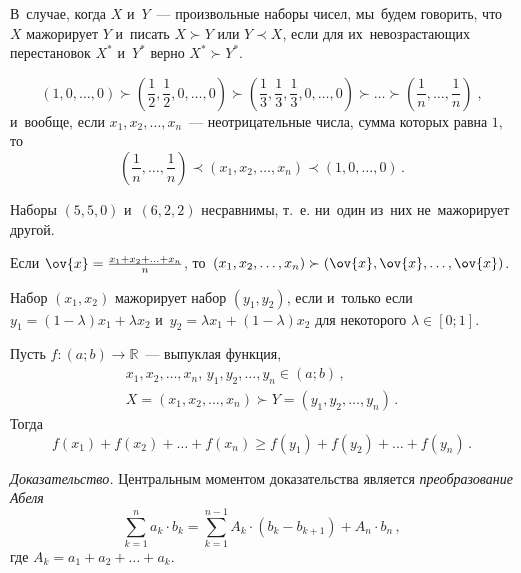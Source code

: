 В~случае, когда $X$ и~$Y$~— произвольные наборы чисел, мы~будем говорить,
что $X$ мажорирует $Y$ и~писать $X\succ Y$ или $Y\prec X$, если для
их~невозрастающих перестановок $X^*$ и~$Y^*$ верно $X^*\succ Y^*$.

\[
    \left( 1, 0, \ldots, 0 \right)
\succ
    \left( \frac{1}{2}, \frac{1}{2}, 0, \ldots,0 \right)
\succ
    \left( \frac{1}{3}, \frac{1}{3}, \frac{1}{3}, 0, \ldots, 0 \right)
\succ\ldots\succ
    \left( \frac{1}{n}, \ldots, \frac{1}{n} \right)
\; , \]
и~вообще, если $x_1, x_2, \ldots, x_n$~— неотрицательные числа, сумма
которых равна $1$, то%
\[
    \left( \frac{1}{n}, \ldots, \frac{1}{n} \right)
\prec
    \left( x_1, x_2, \ldots, x_n \right)
\prec
    \left( 1, 0, \ldots, 0 \right)
\, . \]

Наборы $(5, 5, 0)$ и~$(6, 2, 2)$ несравнимы, т.~е. ни~один из~них
не~мажорирует другой.

Если $\ov{x} = \frac{x_1 + x_2 + \ldots + x_n}{n}$,
то~$(x_1, x_2, \ldots, x_n) \succ (\ov{x}, \ov{x}, \ldots, \ov{x})$.

Набор $(x_1, x_2)$ мажорирует набор $(y_1, y_2)$, если и~только если
$y_1 = (1 - \lambda) x_1 + \lambda x_2$
и~$y_2 = \lambda x_1 + (1 - \lambda) x_2$
для некоторого $\lambda \in [0; 1]$.

\hrulefill

Пусть $f \colon (a; b) \to \mathbb{R}$~— выпуклая функция,
\begin{gather*}
    x_1, x_2, \ldots, x_n, \, y_1, y_2, \ldots, y_n \in (a; b)
\, , \\
    X = (x_1, x_2, \ldots, x_n) \succ Y = (y_1, y_2, \ldots, y_n)
\, . \end{gather*}
Тогда
\[
    f(x_1) + f(x_2) + \ldots + f(x_n)
\geq
    f(y_1) + f(y_2) + \ldots + f(y_n)
\, . \]

\textit{Доказательство.}
Центральным моментом доказательства является \emph{преобразование Абеля}
\[
    \sum\limits_{k=1}^n
        a_k \cdot b_k
=
    \sum\limits_{k=1}^{n-1}
        A_k \cdot (b_k - b_{k+1}) + A_n \cdot b_n
\, , \]
где $A_k = a_1 + a_2 + \ldots + a_k$.

